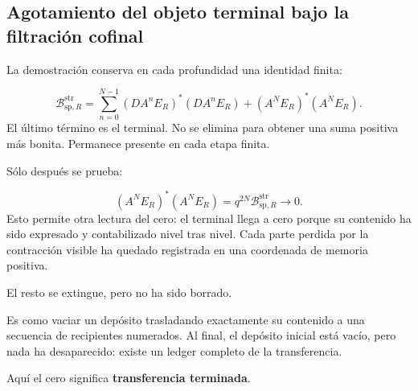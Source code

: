 \subsection{Agotamiento del objeto terminal bajo la filtración cofinal}
La demostración conserva en cada profundidad una identidad finita:\par
\[
\mathcal B_{\mathrm{sp},R}^{\mathrm{str}}
=
\sum_{n=0}^{N-1}
(DA^nE_R)^*(DA^nE_R)
+
(A^NE_R)^*(A^NE_R).
\]
El último término es el terminal. No se elimina para obtener una suma positiva más bonita. Permanece presente en cada etapa finita.\par
Sólo después se prueba:\par
\[
(A^NE_R)^*(A^NE_R)
=
q^{2N}
\mathcal B_{\mathrm{sp},R}^{\mathrm{str}}
\longrightarrow0.
\]
Esto permite otra lectura del cero: el terminal llega a cero porque su contenido ha sido expresado y contabilizado nivel tras nivel. Cada parte perdida por la contracción visible ha quedado registrada en una coordenada de memoria positiva.\par
El resto se extingue, pero no ha sido borrado.\par
Es como vaciar un depósito trasladando exactamente su contenido a una secuencia de recipientes numerados. Al final, el depósito inicial está vacío, pero nada ha desaparecido: existe un ledger completo de la transferencia.\par
Aquí el cero significa \textbf{transferencia terminada}.\par
{}
